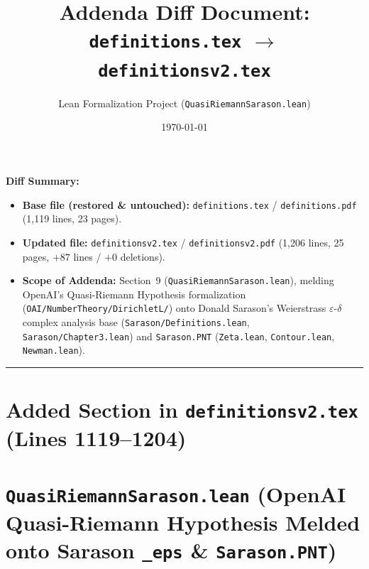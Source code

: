 \documentclass[11pt]{article}
\title{Addenda Diff Document: \texttt{definitions.tex} $\longrightarrow$ \texttt{definitionsv2.tex}}
\author{Lean Formalization Project (\texttt{QuasiRiemannSarason.lean})}
\date{\today}
\begin{document}
\maketitle

\noindent
\textbf{Diff Summary:}
\begin{itemize}
    \item \textbf{Base file (restored \& untouched):} \texttt{definitions.tex} / \texttt{definitions.pdf} (1,119 lines, 23 pages).
    \item \textbf{Updated file:} \texttt{definitionsv2.tex} / \texttt{definitionsv2.pdf} (1,206 lines, 25 pages, $+87$ lines / $+0$ deletions).
    \item \textbf{Scope of Addenda:} Section~9 (\texttt{QuasiRiemannSarason.lean}), melding OpenAI's Quasi-Riemann Hypothesis formalization (\texttt{OAI/NumberTheory/DirichletL/}) onto Donald Sarason's Weierstrass $\varepsilon$-$\delta$ complex analysis base (\texttt{Sarason/Definitions.lean}, \texttt{Sarason/Chapter3.lean}) and \texttt{Sarason.PNT} (\texttt{Zeta.lean}, \texttt{Contour.lean}, \texttt{Newman.lean}).
\end{itemize}

\noindent\rule{\textwidth}{0.4pt}

\section*{Added Section in \texttt{definitionsv2.tex} (Lines 1119--1204)}

\section{\texttt{QuasiRiemannSarason.lean} (OpenAI Quasi-Riemann Hypothesis Melded onto Sarason \texttt{\_eps} \& \texttt{Sarason.PNT})}
\end{document}
